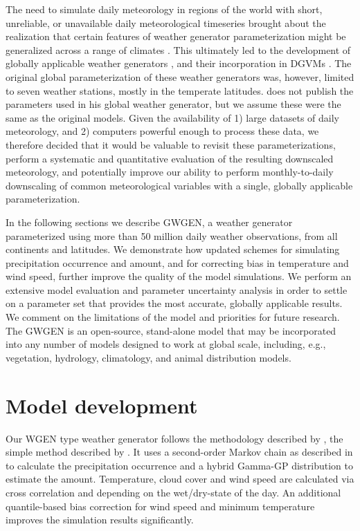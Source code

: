\begin{refsection}
The need to simulate daily meteorology in regions of the world with short, unreliable, or unavailable daily meteorological timeseries brought about the realization that certain features of weather generator parameterization might be generalized across a range of climates \citep{GengAuburn1987,GengDevriesSupit1986}. This ultimately led to the development of globally applicable weather generators \citep{Friend1998}, and their incorporation in DGVMs \citep{BondeauSmithZaehleEtAl2007,GertenSchaphoffHaberlandtEtAl2004,PfeifferSpessaKaplan2013}. The original global parameterization \citep{GengDevriesSupit1986} of these weather generators was, however, limited to seven weather stations, mostly in the temperate latitudes. \cite{Friend1998} does not publish the parameters used in his global weather generator, but we assume these were the same as the original \cite{GengAuburn1987,GengDevriesSupit1986} models. Given the availability of 1) large datasets of daily meteorology, and 2) computers powerful enough to process these data, we therefore decided that it would be valuable to revisit these parameterizations, perform a systematic and quantitative evaluation of the resulting downscaled meteorology, and potentially improve our ability to perform monthly-to-daily downscaling of common meteorological variables with a single, globally applicable parameterization.

In the following sections we describe GWGEN, a weather generator parameterized using more than 50 million daily weather observations, from all continents and latitudes. We demonstrate how updated schemes for simulating precipitation occurrence and amount, and for correcting bias in temperature and wind speed, further improve the quality of the model simulations. We perform an extensive model evaluation and parameter uncertainty analysis in order to settle on a parameter set that provides the most accurate, globally applicable results. We comment on the limitations of the model and priorities for future research. The GWGEN is an open-source, stand-alone model that may be incorporated into any number of models designed to work at global scale, including, e.g., vegetation, hydrology, climatology, and animal distribution models.


\section{Model development}

Our WGEN type weather generator follows the methodology described by \cite{Richardson1981}, the simple method described by \cite{GengDevriesSupit1986}. It uses a second-order Markov chain as described in \cite{Wilks1999} to calculate the precipitation occurrence and a hybrid Gamma-GP distribution \citep{NeykovNeytchevZucchini2014} to estimate the amount. Temperature, cloud cover and wind speed are calculated via cross correlation and depending on the wet/dry-state of the day. An additional quantile-based bias correction for wind speed and minimum temperature improves the simulation results significantly.


\end{refsection}
